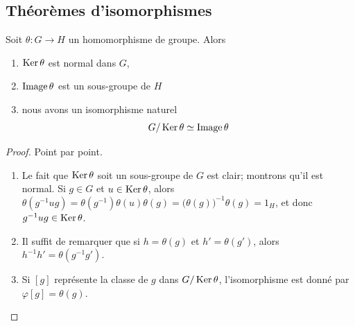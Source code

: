 \subsection{Théorèmes d'isomorphismes}

\begin{theorem}        \label{ThoPremierthoisomo}
    Soit \( \theta\colon G\to H\) un homomorphisme de groupe. Alors
    \begin{enumerate}
        \item
            \( \operatorname{Ker}\theta\) est normal dans \( G\),
        \item
            \( \operatorname{Image} \theta\) est un sous-groupe de \( H\)
        \item   \label{ItemWLCLdk}
            nous avons un isomorphisme naturel
            \begin{equation}
                G/\operatorname{Ker}\theta\simeq \operatorname{Image}\theta
            \end{equation}
    \end{enumerate}
\end{theorem}

\begin{proof}
    Point par point.
    \begin{enumerate}
        \item
            Le fait que  \( \operatorname{Ker}\theta\) soit un sous-groupe de \( G\) est clair; montrons qu'il est normal. Si \( g \in G \) et \( u \in \operatorname{Ker}\theta\), alors \(\theta (g^{-1} u g) = \theta(g^{-1})\theta(u)\theta(g) = \bigl(\theta(g)\bigr)^{-1}\theta(g) = 1_H \), et donc \( g^{-1} u g \in \operatorname{Ker}\theta\).
        \item
            Il suffit de remarquer que si \( h = \theta(g) \) et \( h' = \theta(g') \), alors \( h^{-1} h' = \theta(g^{-1} g') \).
        \item
            Si \( [g]\) représente la classe de \( g\) dans \( G/\operatorname{Ker}\theta\), l'isomorphisme est donné par \( \varphi[g]=\theta(g)\).
    \end{enumerate}
\end{proof}

